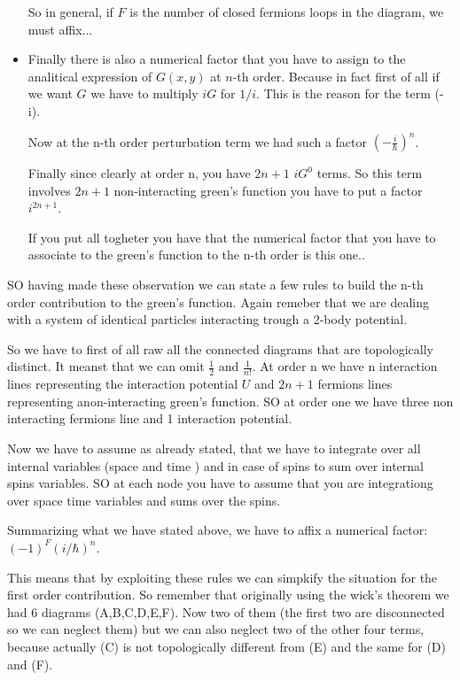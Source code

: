 \documentclass[../main/main.tex]{subfiles}
\begin{document}
\begin{itemize}
So in general, if \( F \) is the number of closed fermions loops in the diagram, we must affix...

\item Finally there is also a numerical factor that you have to assign to the analitical expression of \( G(x,y) \) at \( n \)-th order. Because in fact first of all if we want \( G \) we have to multiply \( iG \) for \( 1/i \). This is the reason for the term (-i).

Now at the n-th order perturbation term we had such a factor \( (-\frac{i}{\hbar })^n \).

Finally since clearly at order n, you have \( 2n+1 \) \( iG^0 \) terms. So this term involves \( 2n+1 \) non-interacting green's function you have to put a factor \( i^{2n+1} \).


If you put all togheter you have that the numerical factor that you have to associate to the green's function to the n-th order is this one..


\end{itemize}

SO having made these observation we can state a few rules to build the n-th order contribution to the green's function. Again remeber that we are dealing with a system of identical particles interacting trough a 2-body potential.

So we have to first of all raw all the connected diagrams that are topologically distinct. It meanst that we can omit \( \frac{1}{2} \) and \( \frac{1}{n!} \). At order n we have n interaction lines representing the interaction potential \( U \) and \( 2n+1 \) fermions lines representing anon-interacting green's function.
SO at order one we have three non interacting fermions line and 1 interaction potential.

Now we have to assume as already stated, that we have to integrate over all internal variables (space and time ) and in case of spins to sum over internal spins variables.
SO at each node you have to assume that you are integrationg over space time variables and sums over the spins.

Summarizing what we have stated above, we have to affix a numerical factor: \( (-1)^F (i/\hbar )^n \).


This means that by exploiting these rules we can simpkify the situation for the first order contribution. So remember that originally using the wick's theorem we had 6 diagrams (A,B,C,D,E,F). Now two of them (the first two are disconnected so we can neglect them) but we can also neglect two of the other four terms, because actually (C) is not topologically different from (E) and the same for (D) and (F).
\end{document}
